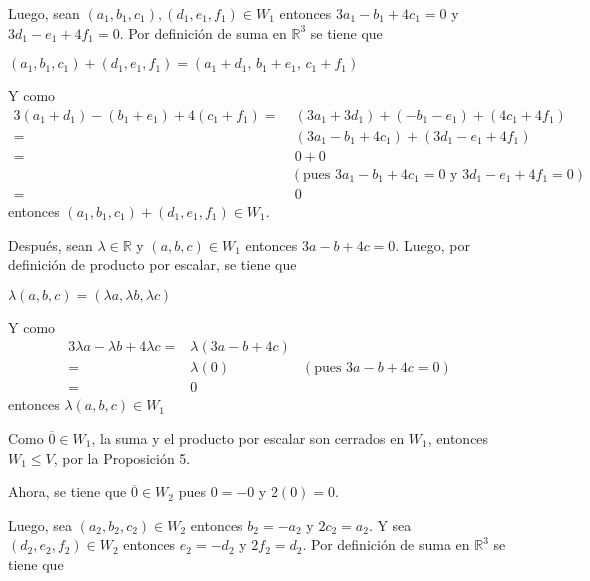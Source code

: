 \documentclass[fleqn]{article}                       %
\begin{document}
\begin{enumerate}
\begin{enumerate}
            Luego, sean $ (a_1,b_1,c_1), (d_1,e_1,f_1) \in W_1 $ entonces $ 3a_1 - b_1 + 4c_1 = 0 $ y $ 3d_1 - e_1 + 4f_1 = 0 $. Por definición de suma en $ \mathbb{R}^3 $ se tiene que \par

            $ (a_1,b_1,c_1) + (d_1,e_1,f_1) = (a_1+d_1, \, b_1+e_1, \, c_1+f_1) $ \par

            Y como
            \begin{align*}
                3(a_1+d_1) - (b_1+e_1) + 4(c_1+f_1) =& \; (3a_1 + 3d_1) + (- b_1 - e_1) + (4c_1 + 4f_1) \\
                =& \; (3a_1 - b_1 + 4c_1) + (3d_1 - e_1 + 4f_1) \\
                =& \; 0 + 0 \\
                & (\text{pues } 3a_1 - b_1 + 4c_1 = 0 \text{ y } 3d_1 - e_1 + 4f_1 = 0) \\
                =& \; 0
            \end{align*}
            entonces $ (a_1,b_1,c_1) + (d_1,e_1,f_1) \in W_1 $.

            Después, sean $ \lambda \in \mathbb{R} $ y $ (a,b,c) \in W_1 $ entonces $ 3a - b + 4c = 0 $. Luego, por definición de producto por escalar, se tiene que \par

            $ \lambda (a,b,c) = (\lambda a, \lambda b, \lambda c) $ \par

            Y como
            \begin{align*}
                3\lambda a - \lambda b + 4 \lambda c =& \lambda (3a - b + 4c) \\
                =& \lambda (0) &(\text{pues } 3a - b + 4c = 0) \\
                =& 0
            \end{align*}
            entonces $ \lambda (a,b,c) \in W_1 $ \par

            Como $ \overline{0} \in W_1 $, la suma y el producto por escalar son cerrados en $ W_1 $, entonces $ W_1 \leq V $, por la Proposición 5.
            
            Ahora, se tiene que $ \overline{0} \in W_2 $ pues $ 0 = -0 $ y $ 2(0) = 0 $.

            Luego, sea $ (a_2,b_2,c_2) \in W_2 $ entonces $ b_2 = -a_2 $ y $ 2c_2 = a_2 $. Y sea $ (d_2,e_2,f_2) \in W_2 $ entonces $ e_2 = -d_2 $ y $ 2f_2 = d_2 $. Por definición de suma en $ \mathbb{R}^3 $ se tiene que \par


\end{enumerate}
\end{enumerate}
\end{document}
